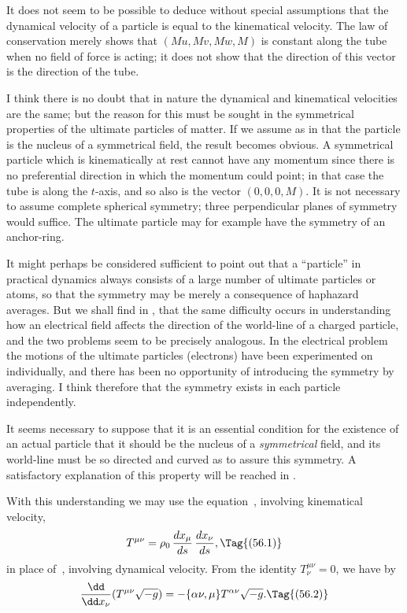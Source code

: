 \documentclass[12pt]{book}
\begin{document}
It does not seem to be possible to deduce without special assumptions that
the dynamical velocity of a particle is equal to the kinematical velocity. The
law of conservation merely shows that $(Mu, Mv, Mw, M)$ is constant along the
tube when no field of force is acting; it does not show that the direction of
this vector is the direction of the tube.

I think there is no doubt that in nature the dynamical and kinematical
velocities are the same; but the reason for this must be sought in the symmetrical
properties of the ultimate particles of matter. If we assume as in
 that the particle is the nucleus of a symmetrical field, the result becomes
obvious. A symmetrical particle which is kinematically at rest cannot have
any momentum since there is no preferential direction in which the momentum
could point; in that case the tube is along the $t$-axis, and so also is the vector
$(0, 0, 0, M)$. It is not necessary to assume complete spherical symmetry;
%
three perpendicular planes of symmetry would suffice. The ultimate particle
may for example have the symmetry of an anchor\hyp{}ring.

It might perhaps be considered sufficient to point out that a ``particle'' in
practical dynamics always consists of a large number of ultimate particles or
atoms, so that the symmetry may be merely a consequence of haphazard
averages. But we shall find in , that the same difficulty occurs in understanding
how an electrical field affects the direction of the world-line of a
charged particle, and the two problems seem to be precisely analogous. In
the electrical problem the motions of the ultimate particles (electrons) have
been experimented on individually, and there has been no opportunity of
introducing the symmetry by averaging. I think therefore that the symmetry
exists in each particle independently.

It seems necessary to suppose that it is an essential condition for the
existence of an actual particle that it should be the nucleus of a \emph{symmetrical}
field, and its world-line must be so directed and curved as to assure this
symmetry. A satisfactory explanation of this property will be reached in .

With this understanding we may use the equation~, involving kinematical
velocity,
\[
T^{\mu\nu} = \rho_{0}\, \frac{dx_{\mu}}{ds}\, \frac{dx_{\nu}}{ds},
\Tag{(56.1)}
\]
in place of~, involving dynamical velocity. From the identity $T_{\nu}^{\mu\nu} = 0$, we
have by~
\[
\frac{\dd}{\dd x_{\nu}} (T^{\mu\nu} \sqrt{-g})
= -\{\alpha\nu, \mu\} T^{\alpha\nu} \sqrt{-g}.
\Tag{(56.2)}
\]
\end{document}

